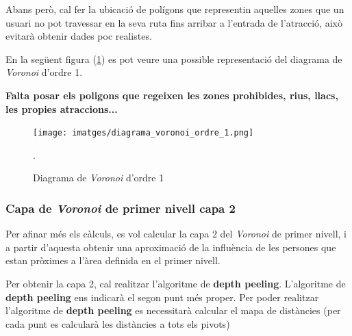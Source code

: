 \documentclass[12pt]{article}
\begin{document}
Abans però, cal fer la ubicació de polígons que representin aquelles zones que un usuari no pot travessar en la seva ruta fins arribar a l'entrada de l'atracció, això evitarà obtenir dades poc realistes. 

En la següent figura (\ref{fig:diagrama_voronoi_ordre_1}) es pot veure una possible representació del diagrama de \textit{Voronoi} d'ordre 1.

\textbf{Falta posar els poligons que regeixen les zones prohibides, rius, llacs, les propies atraccions...}

\begin{figure}[H]
	\centering
	\texttt{[image: imatges/diagrama\_voronoi\_ordre\_1.png]}\par\vspace{1cm}
	\caption{Diagrama de \textit{Voronoi} d'ordre 1}.
	\label{fig:diagrama_voronoi_ordre_1}
\end{figure}

\subsubsection{Capa de \textit{Voronoi} de primer nivell capa 2}
Per afinar més els càlculs, es vol calcular la capa 2 del \textit{Voronoi} de primer nivell, i a partir d'aquesta obtenir una aproximació de la influència de les persones que estan pròximes a l'àrea definida en el primer nivell.

Per obtenir la capa 2, cal realitzar l'algoritme de \textbf{depth peeling}. L'algoritme de \textbf{depth peeling} ens indicarà el segon punt més proper. Per poder realitzar l'algoritme de \textbf{depth peeling} es necessitarà calcular el mapa de distàncies (per cada punt es calcularà les distàncies a tots els pivots)





\end{document}

